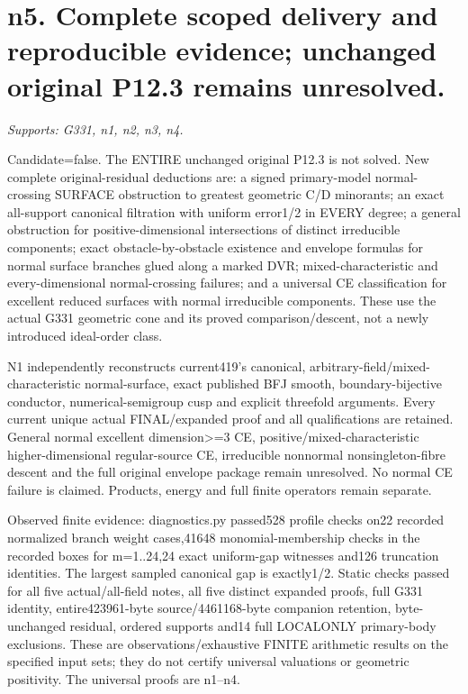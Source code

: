 \documentclass[11pt]{article}
\begin{document}
\section{n5. Complete scoped delivery and reproducible evidence; unchanged original P12.3 remains unresolved.}
\textit{Supports: G331, n1, n2, n3, n4.}

Candidate=false. The ENTIRE unchanged original P12.3 is not solved. New complete original-residual deductions are: a signed primary-model normal-crossing SURFACE obstruction to greatest geometric C/D minorants; an exact all-support canonical filtration with uniform error1/2 in EVERY degree; a general obstruction for positive-dimensional intersections of distinct irreducible components; exact obstacle-by-obstacle existence and envelope formulas for normal surface branches glued along a marked DVR; mixed-characteristic and every-dimensional normal-crossing failures; and a universal CE classification for excellent reduced surfaces with normal irreducible components. These use the actual G331 geometric cone and its proved comparison/descent, not a newly introduced ideal-order class.

N1 independently reconstructs current419's canonical, arbitrary-field/mixed-characteristic normal-surface, exact published BFJ smooth, boundary-bijective conductor, numerical-semigroup cusp and explicit threefold arguments. Every current unique actual FINAL/expanded proof and all qualifications are retained. General normal excellent dimension\textgreater{}=3 CE, positive/mixed-characteristic higher-dimensional regular-source CE, irreducible nonnormal nonsingleton-fibre descent and the full original envelope package remain unresolved. No normal CE failure is claimed. Products, energy and full finite operators remain separate.

Observed finite evidence: diagnostics.py passed528 profile checks on22 recorded normalized branch weight cases,41648 monomial-membership checks in the recorded boxes for m=1..24,24 exact uniform-gap witnesses and126 truncation identities. The largest sampled canonical gap is exactly1/2. Static checks passed for all five actual/all-field notes, all five distinct expanded proofs, full G331 identity, entire423961-byte source/4461168-byte companion retention, byte-unchanged residual, ordered supports and14 full LOCALONLY primary-body exclusions. These are observations/exhaustive FINITE arithmetic results on the specified input sets; they do not certify universal valuations or geometric positivity. The universal proofs are n1--n4.
\end{document}
